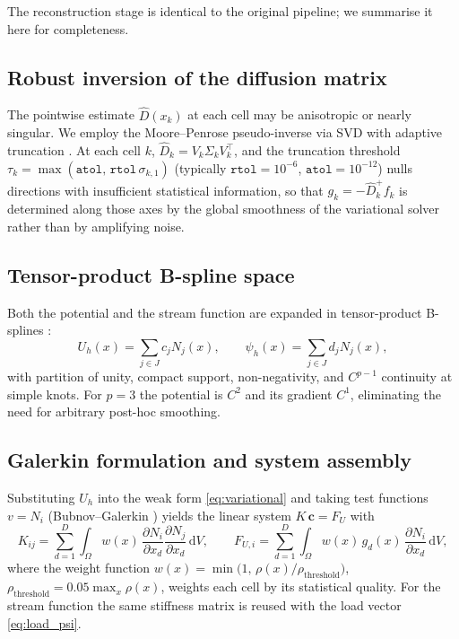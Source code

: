 \documentclass[11pt,a4paper]{article}
\newcommand{\dd}{\mathrm{d}}
\newcommand{\topT}{^{\top}}
\begin{document}
The reconstruction stage is identical to the original pipeline; we summarise it
here for completeness.

\subsection{Robust inversion of the diffusion matrix}

The pointwise estimate $\hat D(x_k)$ at each cell may be anisotropic or nearly
singular. We employ the Moore--Penrose pseudo-inverse via SVD with adaptive
truncation \cite{golub2013}. At each cell $k$,
$\hat D_k = V_k \Sigma_k V_k\topT$, and the truncation threshold
$\tau_k = \max(\texttt{atol},\, \texttt{rtol}\, \sigma_{k,1})$ (typically
$\texttt{rtol} = 10^{-6}$, $\texttt{atol} = 10^{-12}$) nulls directions with
insufficient statistical information, so that
$g_k = -\hat D_k^{+} f_k$ is determined along those axes by the global
smoothness of the variational solver rather than by amplifying noise.

\subsection{Tensor-product B-spline space}

Both the potential and the stream function are expanded in tensor-product
B-splines \cite{piegl2012,cottrell2009}:
\begin{equation}
U_h(x) = \sum_{j \in J} c_j N_j(x),
\qquad
\psi_h(x) = \sum_{j \in J} d_j N_j(x),
\end{equation}
with partition of unity, compact support, non-negativity, and $C^{p-1}$
continuity at simple knots. For $p = 3$ the potential is $C^2$ and its
gradient $C^1$, eliminating the need for arbitrary post-hoc smoothing.

\subsection{Galerkin formulation and system assembly}

Substituting $U_h$ into the weak form \eqref{eq:variational} and taking test
functions $v = N_i$ (Bubnov--Galerkin \cite{cottrell2009}) yields the linear
system $K\,\mathbf{c} = F_U$ with
\begin{equation}
K_{ij} = \sum_{d=1}^{D} \int_\Omega w(x)\,
\frac{\partial N_i}{\partial x_d} \frac{\partial N_j}{\partial x_d} \, \dd V,
\qquad
F_{U,i} = \sum_{d=1}^{D} \int_\Omega w(x)\, g_d(x)\,
\frac{\partial N_i}{\partial x_d} \, \dd V,
\end{equation}
where the weight function
$w(x) = \min\big(1,\, \rho(x)/\rho_{\mathrm{threshold}}\big)$,
$\rho_{\mathrm{threshold}} = 0.05 \max_x \rho(x)$, weights each cell by its
statistical quality. For the stream function the same stiffness matrix is
reused with the load vector \eqref{eq:load_psi}.
\end{document}
